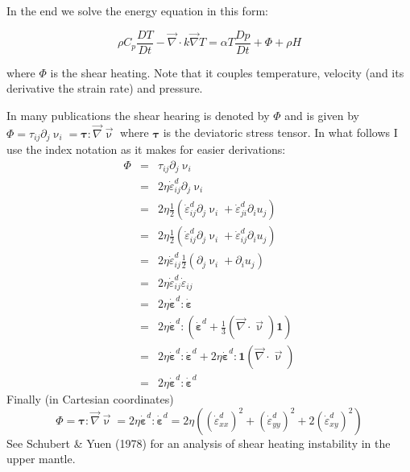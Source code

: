 In the end we solve the energy equation in this form:
\begin{mdframed}[backgroundcolor=blue!5]
\begin{equation}
\rho C_p \frac{DT}{Dt} - {\vec \nabla} \cdot k {\vec \nabla} T =  \alpha T \frac{Dp}{Dt} + \Phi + \rho H  
\end{equation}
\end{mdframed}
where $\Phi$ is the shear heating.
Note that it couples temperature, velocity (and its derivative the strain rate) and pressure. 


In many publications the shear hearing is denoted by $\Phi$ and is given by 
$\Phi=\tau_{ij}\partial_j \upnu_i={\bm \tau}:{\vec \nabla}{\vec \upnu}$ where 
${\bm \tau}$ is the deviatoric stress tensor.
In what follows I use the index notation as it makes for easier derivations:
\begin{eqnarray}
\Phi 
&=& \tau_{ij}\partial_j \upnu_i \nonumber\\
&=& 2 \eta \dot{\varepsilon}_{ij}^d\partial_j \upnu_i \nonumber\\
&=& 2 \eta \frac{1}{2}\left( \dot{\varepsilon}_{ij}^d\partial_j \upnu_i + \dot{\varepsilon}_{ji}^d\partial_i u_j \right) \nonumber\\
&=& 2 \eta \frac{1}{2}\left( \dot{\varepsilon}_{ij}^d\partial_j \upnu_i + \dot{\varepsilon}_{ij}^d\partial_i u_j \right) \nonumber\\
&=& 2 \eta  \dot{\varepsilon}_{ij}^d  \frac{1}{2}\left(\partial_j \upnu_i + \partial_i u_j \right) \nonumber\\
&=& 2 \eta  \dot{\varepsilon}_{ij}^d   \dot{\varepsilon}_{ij} \nonumber\\
&=& 2 \eta  \dot{\bm \varepsilon}^d :  \dot{\bm \varepsilon} \nonumber\\
&=& 2 \eta  \dot{\bm \varepsilon}^d : \left( \dot{\bm \varepsilon}^d +\frac{1}{3} ({\vec \nabla}\cdot{\vec \upnu}) {\bm 1} \right)\nonumber\\
&=& 2 \eta  \dot{\bm \varepsilon}^d : \dot{\bm \varepsilon}^d 
+ 2 \eta  \dot{\bm \varepsilon}^d : {\bm 1} ({\vec \nabla}\cdot{\vec \upnu}) \nonumber\\ 
&=& 2 \eta  \dot{\bm \varepsilon}^d : \dot{\bm \varepsilon}^d \label{eq:physicsshearheating} 
\end{eqnarray}
Finally (in Cartesian coordinates)
\begin{equation}
\Phi = {\bm \tau}:{\vec \nabla}{\vec \upnu} = 2 \eta  \dot{\bm \varepsilon}^d : \dot{\bm \varepsilon}^d
= 2 \eta \left( (\dot{\varepsilon}_{xx}^d)^2 + (\dot{\varepsilon}_{yy}^d)^2 + 2(\dot{\varepsilon}_{xy}^d)^2 \right) 
\end{equation}
See Schubert \& Yuen (1978) \cite{scyu78} for an analysis of shear heating instability in the upper mantle.

